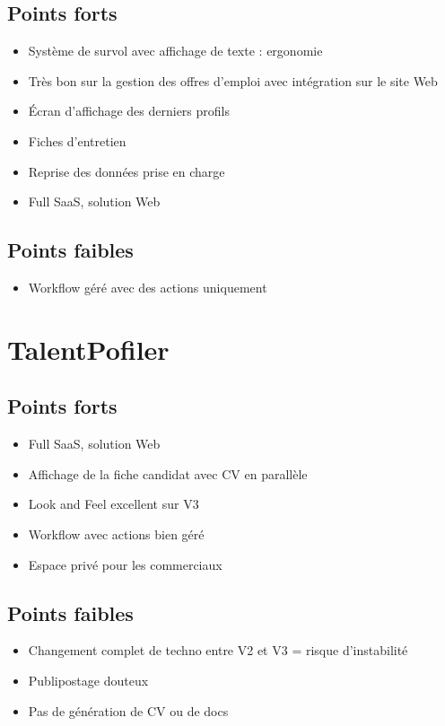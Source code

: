 \documentclass[12pt,twoside]{scrreprt}
\begin{document}
\subsection{Points forts}
\begin{itemize}
	\item Système de survol avec affichage de texte : ergonomie
	\item Très bon sur la gestion des offres d'emploi avec intégration sur le site Web
	\item Écran d'affichage des derniers profils
	\item Fiches d'entretien
	\item Reprise des données prise en charge
	\item Full SaaS, solution Web
\end{itemize}
\subsection{Points faibles}
\begin{itemize}
	\item Workflow géré avec des actions uniquement
\end{itemize}


\section{TalentPofiler}

\subsection{Points forts}
\begin{itemize}
	\item Full SaaS, solution Web
	\item Affichage de la fiche candidat avec CV en parallèle
	\item Look and Feel excellent sur V3
	\item Workflow avec actions bien géré
	\item Espace privé pour les commerciaux
\end{itemize}
\subsection{Points faibles}
\begin{itemize}
	\item Changement complet de techno entre V2 et V3 = risque d'instabilité
	\item Publipostage douteux
	\item Pas de génération de CV ou de docs
\end{itemize}
\end{document}
